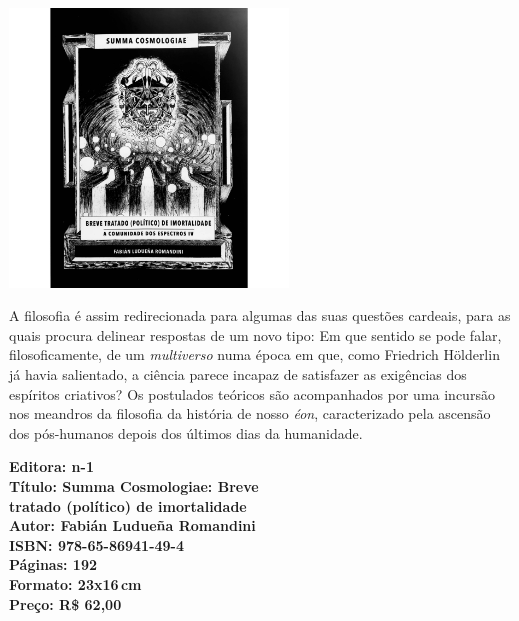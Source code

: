 \pagebreak

\begin{center}
\hspace*{.5cm}\includegraphics[width=74mm]{./CAPAS/N-1_TRATADO.jpg}
\end{center}

\hspace*{-7cm}\hrulefill\hspace*{-7cm}

\medskip

\noindent{}A filosofia é assim redirecionada para algumas das suas questões cardeais, para as quais procura delinear respostas de um novo tipo: 
Em que sentido se pode falar, filosoficamente, de um \textit{multiverso} numa época em que, como Friedrich Hölderlin já havia salientado, a ciência parece incapaz de satisfazer as exigências dos espíritos criativos? Os postulados teóricos são acompanhados por uma incursão nos meandros da filosofia da história de nosso \textit{éon}, caracterizado pela ascensão dos pós-humanos depois dos últimos dias da humanidade.
\vfill

\hspace*{-.4cm}\begin{minipage}[c]{1\linewidth}
\small\textbf{
\hspace*{-.1cm}Editora: n-1\\
Título: Summa Cosmologiae: Breve\\tratado (político) de imortalidade\\
Autor: Fabián Ludueña Romandini\\
ISBN: 978-65-86941-49-4\\
Páginas: 192\\
Formato: 23x16\,cm\\
Preço: R\$ 62,00\\
}
\end{minipage}

